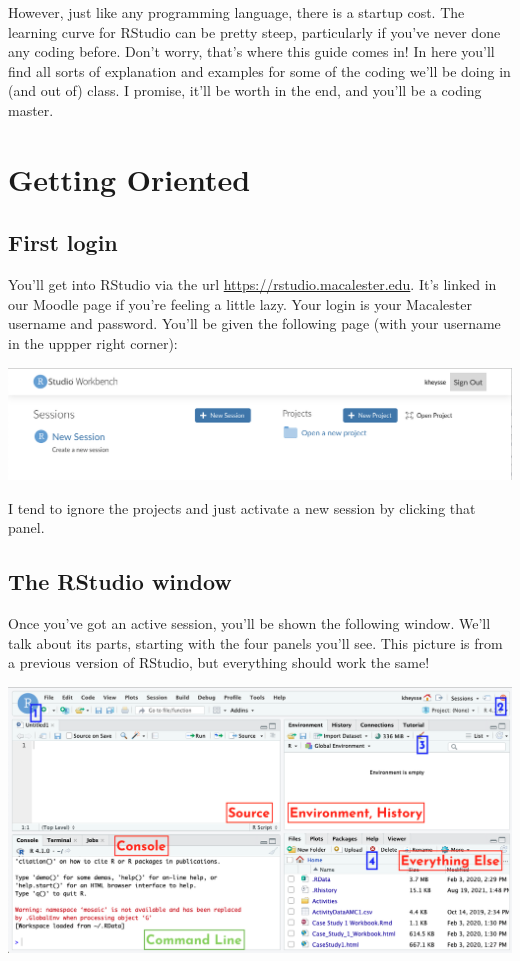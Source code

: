\documentclass[
]{book}
\begin{document}
However, just like any programming language, there is a startup cost. The learning curve for RStudio can be pretty steep, particularly if you've never done any coding before. Don't worry, that's where this guide comes in! In here you'll find all sorts of explanation and examples for some of the coding we'll be doing in (and out of) class. I promise, it'll be worth in the end, and you'll be a coding master.

\hypertarget{getting-oriented}{%
\section{Getting Oriented}\label{getting-oriented}}

\hypertarget{first-login}{%
\subsection{First login}\label{first-login}}

You'll get into RStudio via the url \url{https://rstudio.macalester.edu}. It's linked in our Moodle page if you're feeling a little lazy. Your login is your Macalester username and password. You'll be given the following page (with your username in the uppper right corner):

\includegraphics{images/FirstPage.png}

I tend to ignore the projects and just activate a new session by clicking that panel.

\hypertarget{the-rstudio-window}{%
\subsection{The RStudio window}\label{the-rstudio-window}}

Once you've got an active session, you'll be shown the following window. We'll talk about its parts, starting with the four panels you'll see. This picture is from a previous version of RStudio, but everything should work the same!

\includegraphics{images/RStudioWindow.png}
\end{document}
